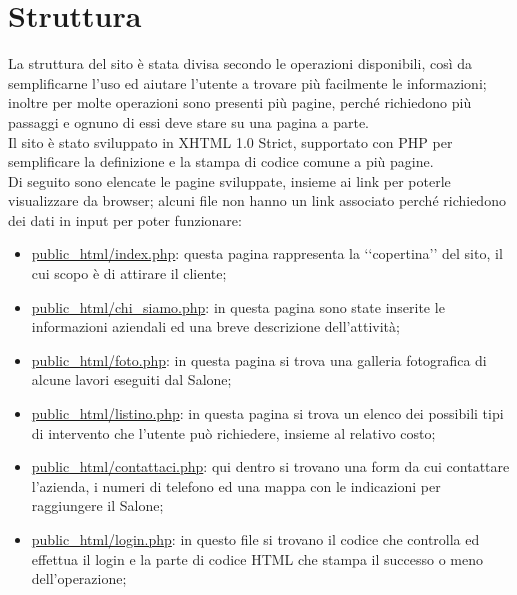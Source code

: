 \section{Struttura}{
	La struttura del sito è stata divisa secondo le operazioni disponibili, così da semplificarne l'uso ed aiutare l'utente a trovare più facilmente le informazioni; inoltre per molte operazioni sono presenti più pagine, perché richiedono più passaggi e ognuno di essi deve stare su una pagina a parte.
	\\
	Il sito è stato sviluppato in XHTML 1.0 Strict, supportato con PHP per semplificare la definizione e la stampa di codice comune a più pagine.
	\\
	Di seguito sono elencate le pagine sviluppate, insieme ai link per poterle visualizzare da browser; alcuni file non hanno un link associato perché richiedono dei dati in input per poter funzionare:
	\begin{itemize}\itemsep1pt
		\item \href{http://tecnologie-web.studenti.math.unipd.it/tecweb/~pgabelli/}{public\_html/index.php}: questa pagina rappresenta la ‘‘copertina’’ del sito, il cui scopo è di attirare il cliente;
		\item \href{http://tecnologie-web.studenti.math.unipd.it/tecweb/~pgabelli/public\_html/chi\_siamo.php}{public\_html/chi\_siamo.php}: in questa pagina sono state inserite le informazioni aziendali ed una breve descrizione dell'attività;
		\item \href{http://tecnologie-web.studenti.math.unipd.it/tecweb/~pgabelli/public\_html/foto.php}{public\_html/foto.php}: in questa pagina si trova una galleria fotografica di alcune lavori eseguiti dal Salone;
		\item \href{http://tecnologie-web.studenti.math.unipd.it/tecweb/~pgabelli/public\_html/listino.php}{public\_html/listino.php}: in questa pagina si trova un elenco dei possibili tipi di intervento che l'utente può richiedere, insieme al relativo costo;
		\item \href{http://tecnologie-web.studenti.math.unipd.it/tecweb/~pgabelli/public\_html/contattaci.php}{public\_html/contattaci.php}: qui dentro si trovano una form da cui contattare l'azienda, i numeri di telefono ed una mappa con le indicazioni per raggiungere il Salone;
		\item \href{http://tecnologie-web.studenti.math.unipd.it/tecweb/~pgabelli/public\_html/login.php}{public\_html/login.php}: in questo file si trovano il codice che controlla ed effettua il login e la parte di codice HTML che stampa il successo o meno dell'operazione;

\end{itemize}}
